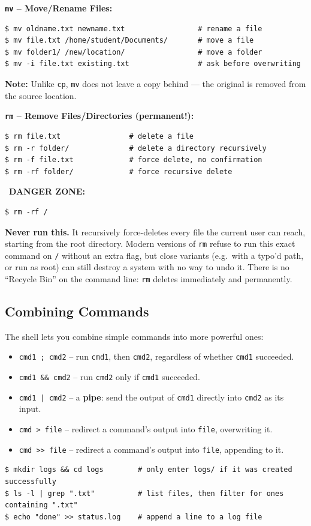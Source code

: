 \textbf{\texttt{mv} -- Move/Rename Files:}
\begin{lstlisting}[language=Terminal]
$ mv oldname.txt newname.txt                 # rename a file
$ mv file.txt /home/student/Documents/       # move a file
$ mv folder1/ /new/location/                 # move a folder
$ mv -i file.txt existing.txt                # ask before overwriting
\end{lstlisting}
\textbf{Note:} Unlike \texttt{cp}, \texttt{mv} does not leave a copy behind — the original is removed from the source location.

\textbf{\texttt{rm} -- Remove Files/Directories (permanent!):}
\begin{lstlisting}[language=Terminal]
$ rm file.txt                # delete a file
$ rm -r folder/              # delete a directory recursively
$ rm -f file.txt             # force delete, no confirmation
$ rm -rf folder/             # force recursive delete
\end{lstlisting}

\faExclamationTriangle\ \textbf{DANGER ZONE:}
\begin{lstlisting}[language=Terminal]
$ rm -rf /
\end{lstlisting}
\textbf{Never run this.} It recursively force-deletes every file the current user can reach, starting from the root directory. Modern versions of \texttt{rm} refuse to run this exact command on \texttt{/} without an extra flag, but close variants (e.g.\ with a typo'd path, or run as root) can still destroy a system with no way to undo it. There is no ``Recycle Bin'' on the command line: \texttt{rm} deletes immediately and permanently.

\subsection{Combining Commands}
The shell lets you combine simple commands into more powerful ones:
\begin{itemize}
    \item \texttt{cmd1 ; cmd2} -- run \texttt{cmd1}, then \texttt{cmd2}, regardless of whether \texttt{cmd1} succeeded.
    \item \texttt{cmd1 \&\& cmd2} -- run \texttt{cmd2} only if \texttt{cmd1} succeeded.
    \item \texttt{cmd1 | cmd2} -- a \textbf{pipe}: send the output of \texttt{cmd1} directly into \texttt{cmd2} as its input.
    \item \texttt{cmd > file} -- redirect a command's output into \texttt{file}, overwriting it.
    \item \texttt{cmd >> file} -- redirect a command's output into \texttt{file}, appending to it.
\end{itemize}
\begin{lstlisting}[language=Terminal]
$ mkdir logs && cd logs        # only enter logs/ if it was created successfully
$ ls -l | grep ".txt"          # list files, then filter for ones containing ".txt"
$ echo "done" >> status.log    # append a line to a log file
\end{lstlisting}

